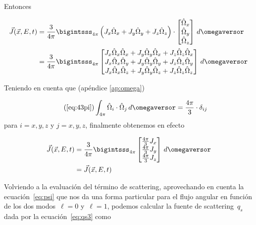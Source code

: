 Entonces

\begin{align*}
\vec{J}(\vec{x},E,t) &= \frac{3}{4\pi} \bigintsss_{4\pi} \left( J_x \hat{\Omega}_x + J_y \hat{\Omega}_y + J_z \hat{\Omega}_z \right) \cdot
\begin{bmatrix}
 \hat{\Omega}_x \\ \hat{\Omega}_y \\ \hat{\Omega}_z
\end{bmatrix}
\, d\omegaversor \\
&= \frac{3}{4\pi} \bigintsss_{4\pi}
\begin{bmatrix}
 J_x \hat{\Omega}_x \hat{\Omega}_x +  J_y \hat{\Omega}_y \hat{\Omega}_x +  J_z \hat{\Omega}_z \hat{\Omega}_x \\
 J_x \hat{\Omega}_x \hat{\Omega}_y +  J_y \hat{\Omega}_y \hat{\Omega}_y +  J_z \hat{\Omega}_z \hat{\Omega}_y \\
 J_x \hat{\Omega}_x \hat{\Omega}_z +  J_y \hat{\Omega}_y \hat{\Omega}_z +  J_z \hat{\Omega}_z \hat{\Omega}_z
\end{bmatrix}
\, d\omegaversor \\
\end{align*}

Teniendo en cuenta que (apéndice \ref{ap:omega})

\begin{equation}\tag{\ref{eq:43pi}}
 \int_{4\pi} \hat{\Omega}_i \cdot \hat{\Omega}_j \, d\omegaversor = \frac{4\pi}{3} \cdot \delta_{ij}
\end{equation}
%
para $i=x,y,z$ y $j=x,y,z$, finalmente obtenemos en efecto

\begin{align}\label{eq:recuperoj}
\vec{J}(\vec{x},E,t) &= \frac{3}{4\pi} \bigintsss_{4\pi}
\begin{bmatrix}
 \frac{4\pi}{3} J_x \\
 \frac{4\pi}{3} J_y \\
 \frac{4\pi}{3} J_z \\
\end{bmatrix}
\, d\omegaversor \nonumber \\
&= \vec{J}(\vec{x},E,t)
\end{align}



\bigskip


Volviendo a la evaluación del término de scattering, aprovechando en cuenta la ecuación~\eqref{eq:psi} que nos da una forma particular para el flujo angular en función de los dos modos~$\ell=0$ y~$\ell=1$, podemos calcular la fuente de scattering~$q_s$ dada por la ecuación~\eqref{eq:qs3} como

